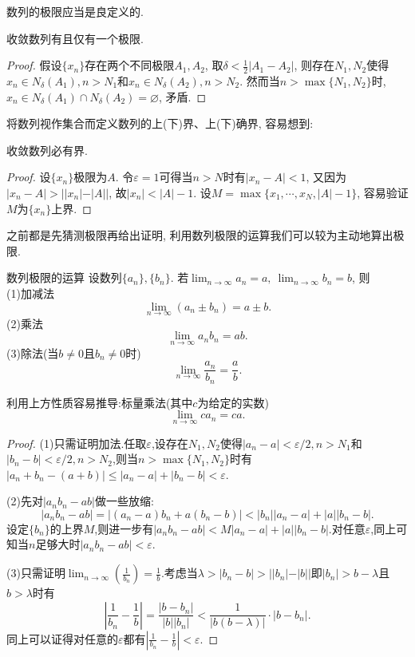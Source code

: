 数列的极限应当是良定义的.

\begin{proposition}{}
	收敛数列有且仅有一个极限.
\end{proposition}
\begin{proof}
	假设$\{ x_n \}$存在两个不同极限$A_1,A_2$, 取$\delta < \frac{1}{2}|A_1-A_2|$, 则存在$N_1,N_2$使得$x_n \in N_{\delta}(A_1),n > N_1$和$x_n \in N_{\delta}(A_2),n > N_2$. 然而当$n>\max \{ N_1,N_2 \}$时, $x_n \in N_{\delta}(A_1) \cap N_{\delta}(A_2) = \varnothing$, 矛盾. 
\end{proof}

将数列视作集合而定义数列的上(下)界、上(下)确界, 容易想到:

\begin{proposition}{}
	收敛数列必有界. 
\end{proposition}
\begin{proof}
	设$\{ x_n \}$极限为$A$. 令$\varepsilon = 1$可得当$n>N$时有$|x_n-A|<1$, 又因为$|x_n-A|>||x_n|-|A||$, 故$|x_n|<|A|-1$. 设$M=\max \{ x_1, \cdots ,x_N,|A|-1 \}$, 容易验证$M$为$\{ x_n \}$上界. 
\end{proof}

之前都是先猜测极限再给出证明, 利用数列极限的运算我们可以较为主动地算出极限. 

\begin{theorem}{数列极限的运算}
	设数列$\{ a_n \},\{ b_n \}$. 若$\lim_{n \to \infty} a_n=a,~\lim_{n \to \infty} b_n=b$, 则 \\
	(1)加减法$$\lim_{n \to \infty}{(a_n \pm b_n)} = a \pm b.$$
	(2)乘法$$\lim_{n \to \infty}{a_nb_n} = ab.$$
	(3)除法(当$b \neq 0$且$b_n \neq 0$时)$$\lim_{n \to \infty}{\frac{a_n}{b_n}} = \frac{a}{b}.$$
\end{theorem}
\begin{remark}
	利用上方性质容易推导:标量乘法(其中$c$为给定的实数)$$\lim_{n \to \infty}{ca_n}=ca.$$
	
\end{remark}
\begin{proof}
	(1)只需证明加法.任取$\varepsilon$,设存在$N_1,N_2$使得$|a_n-a|<\varepsilon /2,n>N_1$和$|b_n-b|<\varepsilon /2,n>N_2$,则当$n>\max \{ N_1,N_2 \}$时有$|a_n+b_n-(a+b)| \leq |a_n-a|+|b_n-b| < \varepsilon$.
	
	(2)先对$|a_nb_n-ab|$做一些放缩:$$|a_nb_n-ab| = |(a_n-a)b_n + a(b_n-b)| < |b_n||a_n-a| + |a||b_n-b|.$$
	设定$\{ b_n \}$的上界$M$,则进一步有$|a_nb_n-ab|<M|a_n-a| + |a||b_n-b|$.对任意$\varepsilon$,同上可知当$n$足够大时$|a_nb_n-ab|<\varepsilon$.
	
	(3)只需证明$\lim_{n\to \infty}(\frac{1}{b_n})=\frac{1}{b}$.考虑当$\lambda > |b_n-b| > ||b_n|-|b||$即$|b_n|>b-\lambda$且$b>\lambda$时有$$\left| \frac{1}{b_n} - \frac{1}{b} \right| = \frac{|b-b_n|}{|b||b_n|} < \frac{1}{|b(b-\lambda)|} \cdot |b-b_n|.$$
	同上可以证得对任意的$\varepsilon$都有$|\frac{1}{b_n}-\frac{1}{b} |<\varepsilon$.
\end{proof}

